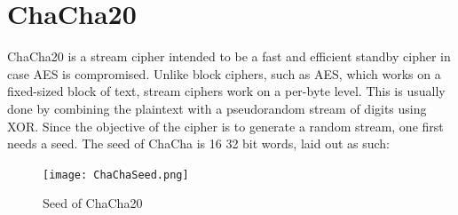 \documentclass[a4paper, openany]{book}
\begin{document}
\section{ChaCha20}
\label{ChaChaalg}
ChaCha20 is a stream cipher intended to be a fast and efficient standby cipher in case AES is compromised. Unlike block ciphers, such as AES, which works on a fixed-sized block of text, stream ciphers work on a per-byte level. This is usually done by combining the plaintext with a pseudorandom stream of digits using XOR. Since the objective of the cipher is to generate a random stream, one first needs a seed. The seed of ChaCha is 16 32 bit words, laid out as such:

\begin{figure}[!htb]
\centering
\texttt{[image: ChaChaSeed.png]}
\caption{Seed of ChaCha20}
\label{fig:ChaChaSeed}
\end{figure}
\end{document}
